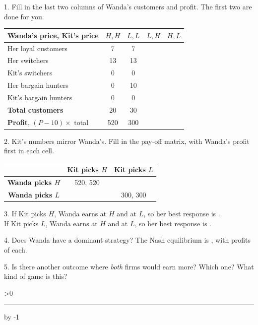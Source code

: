 \documentclass[11pt]{article}
\newcommand{\answerlines}[1]{%
  \par\vspace{1pt}\answerlinecount=#1
  \loop\ifnum\answerlinecount>0
    \rule{\linewidth}{0.3pt}\par\vspace{5pt}%
    \advance\answerlinecount by -1
  \repeat
  \vspace{-5pt}}
\newcommand{\blankrow}{\rule{0pt}{1.5em}}
\begin{document}
\vspace{2pt}
1. Fill in the last two columns of Wanda's customers and profit. The first two are done for you.

\begin{center}
\renewcommand{\arraystretch}{1.25}
\begin{tabular}{|l|c|c|C|C|}
\hline
\textbf{Wanda's price, Kit's price} & $H, H$ & $L, L$ & $L, H$ & $H, L$ \\
\hline
Her loyal customers   & 7  & 7  & \blankrow & \blankrow \\ \hline
Her switchers         & 13 & 13 & \blankrow & \blankrow \\ \hline
Kit's switchers       & 0  & 0  & \blankrow & \blankrow \\ \hline
Her bargain hunters   & 0  & 10 & \blankrow & \blankrow \\ \hline
Kit's bargain hunters & 0  & 0  & \blankrow & \blankrow \\ \hline
\textbf{Total customers} & 20 & 30 & \blankrow & \blankrow \\ \hline
\textbf{Profit}, $(P - 10) \times$ total & 520 & 300 & \blankrow & \blankrow \\ \hline
\end{tabular}
\end{center}

2. Kit's numbers mirror Wanda's. Fill in the pay-off matrix, with Wanda's profit first in each cell.

\begin{center}
\renewcommand{\arraystretch}{1.3}
\begin{tabular}{|c|C|C|}
\hline
 & \textbf{Kit picks $H$} & \textbf{Kit picks $L$} \\
\hline
\textbf{Wanda picks $H$} & 520, 520 & \blankrow \\
\hline
\textbf{Wanda picks $L$} & \blankrow & 300, 300 \\
\hline
\end{tabular}
\end{center}

3. If Kit picks $H$, Wanda earns \underline{\hspace{1.4cm}} at $H$ and \underline{\hspace{1.4cm}} at $L$, so her best response is \underline{\hspace{1cm}}. \\[4pt]
If Kit picks $L$, Wanda earns \underline{\hspace{1.4cm}} at $H$ and \underline{\hspace{1.4cm}} at $L$, so her best response is \underline{\hspace{1cm}}.

4. Does Wanda have a dominant strategy? \underline{\hspace{2cm}} \quad The Nash equilibrium is \underline{\hspace{2.2cm}}, with profits of \underline{\hspace{1.6cm}} each.

5. Is there another outcome where \emph{both} firms would earn more? Which one? What kind of game is this?
\answerlines{2}
\end{document}
